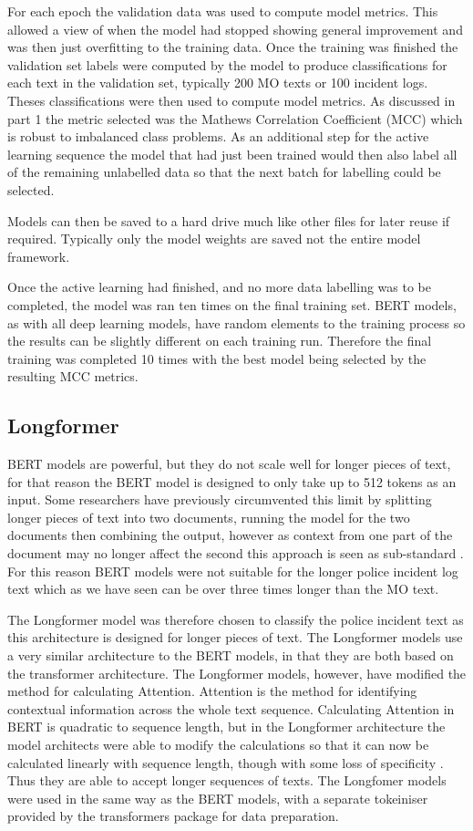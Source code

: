 For each epoch the validation data was used to compute model metrics. This allowed a view of when the model had stopped showing general improvement and was then just overfitting to the training data. Once the training was finished the validation set labels were computed by the model to produce classifications for each text in the validation set, typically 200 MO texts or 100 incident logs. Theses classifications were then used to compute model metrics. As discussed in part 1 the metric selected was the Mathews Correlation Coefficient (MCC) which is robust to imbalanced class problems. As an additional step for the active learning sequence the model that had just been trained would then also label all of the remaining unlabelled data so that the next batch for labelling could be selected.

Models can then be saved to a hard drive much like other files for later reuse if required. Typically only the model weights are saved not the entire model framework. 

Once the active learning had finished, and no more data labelling was to be completed, the model was ran ten times on the final training set. BERT models, as with all deep learning models, have random elements to the training process so the results can be slightly different on each training run. Therefore the final training was completed 10 times with the best model being selected by the resulting MCC metrics. 

\subsection{Longformer} BERT models are powerful, but they do not scale well for longer pieces of text, for that reason the BERT model is designed to only take up to 512 tokens as an input. Some researchers have previously circumvented this limit by splitting longer pieces of text into two documents, running the model for the two documents then combining the output, however as context from one part of the document may no longer affect the second this approach is seen as sub-standard \parencite{Longformer}. For this reason BERT models were not suitable for the longer police incident log text which as we have seen can be over three times longer than the MO text. 

The Longformer model \parencite{Longformer} was therefore chosen to classify the police incident text as this architecture is designed for longer pieces of text. The Longformer models use a very similar architecture to the BERT models, in that they are both based on the transformer architecture. The Longformer models, however, have modified the method for calculating Attention. Attention is the method for identifying contextual information across the whole text sequence. Calculating Attention in BERT is quadratic to sequence length, but in the Longformer architecture the model architects were able to modify the calculations so that it can now be calculated linearly with sequence length, though with some loss of specificity \parencite{Longformer}. Thus they are able to accept longer sequences of texts. The Longfomer models were used in the same way as the BERT models, with a separate tokeiniser provided by the transformers package for data preparation.

